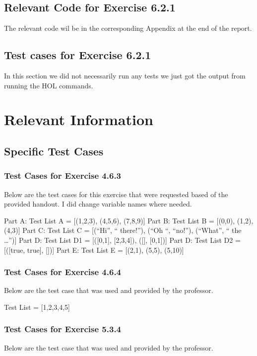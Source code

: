 \documentclass{report}
\begin{document}
\section{Relevant Code for Exercise 6.2.1}
\label{sec:relevant-code-ex-6-2-1}
  The relevant code wil be in the corresponding Appendix at the
  end of the report.

\section{Test cases for Exercise 6.2.1}
\label{sec:tests-ex-6-2-1}
In this section we did not necessarily run any tests we just got the
output from running the HOL commands.

\chapter{Relevant Information}
\label{cha:relevant-information}

\section{Specific Test Cases}
\label{sec:specific-test-cases}

\subsection{Test Cases for Exercise 4.6.3}
\label{sec:test-cases-ex-4-6-3}
Below are the test cases for this exercise that were requested based
of the provided handout. I did change variable names where needed.

Part A: Test List A = [(1,2,3), (4,5,6), (7,8,9)] 
Part B: Test List B = [(0,0), (1,2), (4,3)]
Part C: Test List C = [(“Hi”, “ there!”), (“Oh “, “no!”), (“What”, “ the …”)]
Part D: Test List D1 = [([0,1], [2,3,4]), ([], [0,1])]
Part D: Test List D2 = [([true, true], [])]
Part E: Test List E = [(2,1), (5,5), (5,10)]

\subsection{Test Cases for Exercise 4.6.4}
\label{sec:test-cases-ex-4-6-4}
Below are the test case that was used and provided by the professor.

Test List = [1,2,3,4,5]

\subsection{Test Cases for Exercise 5.3.4}
\label{sec:test-cases-ex-5-3-4}
Below are the test case that was used and provided by the professor.
\end{document}
